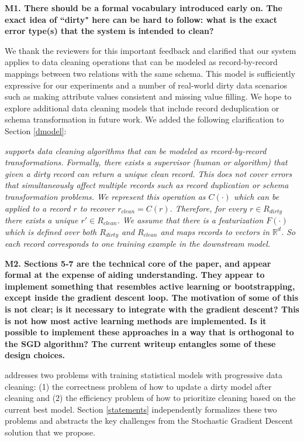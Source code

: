 \noindent\noindent \textbf{M1. There should be a formal vocabulary introduced early on. The exact idea of ``dirty" here can be hard to follow: what is the exact error type(s) that the system is intended to clean?}

\vspace{0.5em}

We thank the reviewers for this important feedback and clarified that our system applies to data cleaning operations that can be modeled as record-by-record mappings between two relations with the same schema.
This model is sufficiently expressive for our experiments and a number of real-world dirty data scenarios such as making attribute values consistent and missing value filling.
We hope to explore additional data cleaning models that include record deduplication or schema transformation in future work.
We added the following clarification to Section \ref{dmodel}:

\emph{\sys supports data cleaning algorithms that can be modeled as record-by-record transformations.
Formally, there exists a supervisor (human or algorithm) that given a dirty record can return a unique clean record.
This does not cover errors that simultaneously affect multiple records such as record duplication or schema transformation problems.
We represent this operation as $C(\cdot)$ which can be applied to a record $r$ to recover $r_{clean} = C(r)$.
Therefore, for every $r \in R_{dirty}$ there exists a unique $r' \in R_{clean}$.
We assume that there is a featurization $F(\cdot)$ which is defined over both $R_{dirty}$ and $R_{clean}$ and maps records to vectors in $\mathbb{R}^d$.
So each record corresponds to one training example in the downstream model.}

\vspace{0.5em}

\noindent\textbf{M2. Sections 5-7 are the technical core of the paper, and appear formal at the expense of aiding understanding. They appear to implement something that resembles active learning or bootstrapping, except inside the gradient descent loop. The motivation of some of this is not clear; is it necessary to integrate with the gradient descent? This is not how most active learning methods are implemented. Is it possible to implement these approaches in a way that is orthogonal to the SGD algorithm? The current writeup entangles some of these design choices.} 

\sys addresses two problems with training statistical models with progressive data cleaning: (1) the correctness problem of how to update a dirty model after cleaning and (2) the efficiency problem of how to prioritize cleaning based on the current best model.
Section \ref{statements} independently formalizes these two problems and abstracts the key challenges from the Stochastic Gradient Descent solution that we propose.

